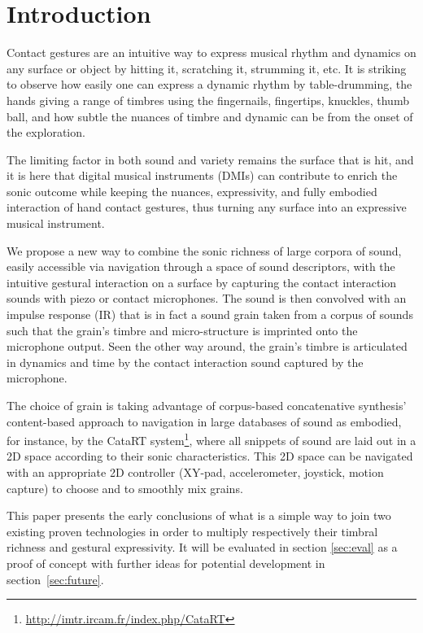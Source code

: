 \section{Introduction}


Contact gestures are an intuitive way to express musical rhythm and dynamics on any surface or object by hitting it, scratching it, strumming it, etc.  It is striking to observe how easily one can express a dynamic rhythm by table-drumming, the hands giving a range of timbres using the fingernails, fingertips, knuckles, thumb ball, and how subtle the nuances of timbre and dynamic can be from the onset of the exploration.

The limiting factor in both sound and variety remains the surface that is hit, and it is here that digital musical instruments (DMIs) can contribute to enrich the sonic outcome while keeping the nuances, expressivity, and fully embodied interaction of hand contact gestures, thus turning any surface into an expressive musical instrument.

We propose a new way to combine the sonic richness of large corpora of sound, easily accessible via navigation through a space of sound descriptors, with the intuitive gestural interaction on a surface by capturing the contact interaction sounds with piezo or contact microphones. The sound is then convolved with an impulse response (IR) that is in fact a sound grain taken from a corpus of sounds such that the grain's timbre and micro-structure is imprinted onto the microphone output.
Seen the other way around, the grain's timbre is articulated in dynamics and time by the contact interaction sound captured by the microphone. 

The choice of grain is taking advantage of corpus-based concatenative synthesis' content-based approach to navigation in large databases of sound as embodied, for instance, by the CataRT system\footnote{\url{http://imtr.ircam.fr/index.php/CataRT}}, where all snippets of sound are laid out in a 2D space according to their sonic characteristics.  This 2D space can be navigated with an appropriate 2D controller (XY-pad, accelerometer, joystick, motion capture) to choose and to smoothly mix grains.

This paper presents the early conclusions of what is a simple way to join two existing proven technologies in order to multiply respectively their timbral richness and gestural expressivity. It will be evaluated in section \ref{sec:eval} as a proof of concept with further ideas for potential development in section~\ref{sec:future}.


